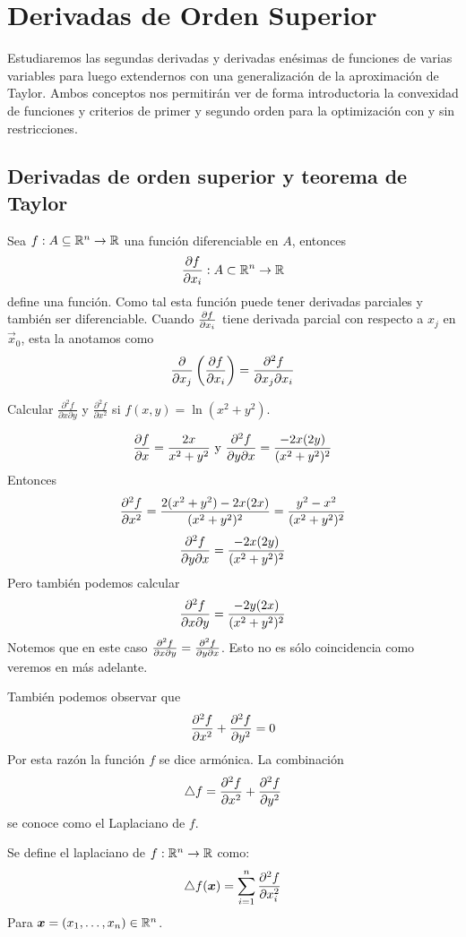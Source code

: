 
\chapter{Derivadas de Orden Superior}\label{cap2}


Estudiaremos las segundas derivadas y derivadas en\'esimas de funciones de varias variables para luego extendernos con una generalizaci\'on de la aproximaci\'on de Taylor. Ambos conceptos nos permitir\'an ver de forma introductoria la convexidad de funciones y criterios de primer y segundo orden para la optimizaci\'on con y sin restricciones.

\section{Derivadas de orden superior y teorema de Taylor}

Sea $\f1$ una funci\'on diferenciable en $A$, entonces
$$
\frac{\partial f}{\partial x_i}:A\subset \mathbb{R}^n\to \mathbb{R}
$$
define una funci\'on.
Como tal esta  funci\'on puede tener derivadas parciales y tambi\'en ser
diferenciable. Cuando  $\frac{\partial f}{\partial x_i}$ tiene derivada parcial con respecto a $x_j$
 en $\vec{x}_0$, esta la anotamos como
$$\frac{\partial}{\partial x_j}\left(\frac{\partial f}{\partial x_i} \right)=\frac{\partial^2f}{\partial x_j\partial x_i}$$

\begin{ejemplo} 
Calcular $\frac{\partial^2f}{\partial x\partial y}$ y $\frac{\partial^2 f}{\partial x^2}$ si $f(x,y)=\ln(x^2+y^2)$.
\end{ejemplo}

\begin{solucion}
$$\frac{\partial f}{\partial x}=\frac{2x}{x^2+y^2} \text{ y } \frac{\partial^2 f}{\partial y\partial x}=\frac{-2x(2y)}{(x^2+y^2)^2}$$
Entonces
$$
\frac{\partial^2 f}{\partial x^2}=\frac{2(x^2+y^2)-2x(2x)}{(x^2+y^2)^2}=\frac{y^2-x^2}{(x^2+y^2)^2}$$
$$\frac{\partial^2 f}{\partial y\partial x}=\frac{-2x(2y)}{(x^2+y^2)^2}$$
Pero tambi\'en podemos calcular
$$\frac{\partial^2 f}{\partial x\partial y}=\frac{-2y(2x)}{(x^2+y^2)^2}$$
Notemos que en este caso $\frac{\partial^2 f}{\partial x\partial y}=\frac{\partial^2 f}{\partial y\partial x}$. Esto no es s\'olo coincidencia como veremos en m\'as adelante.

Tambi\'en podemos observar que
$$\frac{\partial^2 f}{\partial x^2}+\frac{\partial^2 f}{\partial y^2}=0$$
Por esta raz\'on la funci\'on $f$ se dice arm\'onica. La combinaci\'on
$$\triangle f= \frac{\partial^2 f}{\partial x^2}+\frac{\partial^2 f}{\partial y^2}$$ se conoce como el Laplaciano de $f$.
\end{solucion}

\begin{definicion}
Se define el laplaciano de $f:\mathbb{R}^n  \to \mathbb{R}$ como: 
$$\triangle f(\boldsymbol{x}) = \sum\limits_{i = 1}^n \frac{\partial ^2 f}{\partial x_i^2}$$
Para $\boldsymbol{x} = (x_1 ,\ldots,x_n) \in \mathbb{R}^n$.
\end{definicion}

